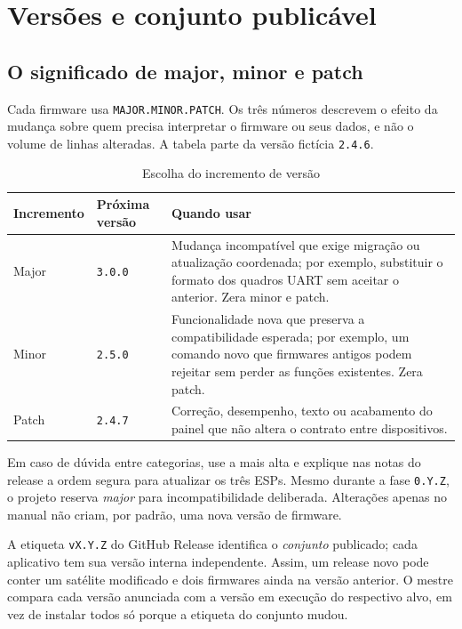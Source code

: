 \section{Versões e conjunto publicável}
\subsection{O significado de major, minor e patch}
Cada firmware usa \texttt{MAJOR.MINOR.PATCH}. Os três números descrevem o efeito da mudança sobre quem precisa interpretar o firmware ou seus dados, e não o volume de linhas alteradas. A tabela parte da versão fictícia \texttt{2.4.6}.
\begin{table}[!htbp]\centering\small
\caption{Escolha do incremento de versão}\label{tab:incremento-versao}
\begin{tabularx}{\textwidth}{@{}l l X@{}}\toprule
Incremento & Próxima versão & Quando usar\\\midrule
Major & \texttt{3.0.0} & Mudança incompatível que exige migração ou atualização coordenada; por exemplo, substituir o formato dos quadros UART sem aceitar o anterior. Zera minor e patch.\\
Minor & \texttt{2.5.0} & Funcionalidade nova que preserva a compatibilidade esperada; por exemplo, um comando novo que firmwares antigos podem rejeitar sem perder as funções existentes. Zera patch.\\
Patch & \texttt{2.4.7} & Correção, desempenho, texto ou acabamento do painel que não altera o contrato entre dispositivos.\\\bottomrule
\end{tabularx}\end{table}
Em caso de dúvida entre categorias, use a mais alta e explique nas notas do release a ordem segura para atualizar os três ESPs. Mesmo durante a fase \texttt{0.Y.Z}, o projeto reserva \emph{major} para incompatibilidade deliberada. Alterações apenas no manual não criam, por padrão, uma nova versão de firmware.

A etiqueta \texttt{vX.Y.Z} do GitHub Release identifica o \emph{conjunto} publicado; cada aplicativo tem sua versão interna independente. Assim, um release novo pode conter um satélite modificado e dois firmwares ainda na versão anterior. O mestre compara cada versão anunciada com a versão em execução do respectivo alvo, em vez de instalar todos só porque a etiqueta do conjunto mudou.

